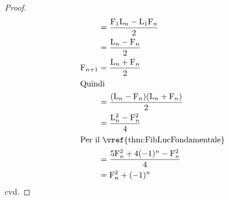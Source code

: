 \begin{proof}
\begin{align*}
		={}                   & \dfrac{\Fib{1}\Luc{n}-\Luc{1}\Fib{n}}{2}      \\
		={}                   & \dfrac{\Luc{n}-\Fib{n}}{2}                    \\
		\Fib{n+1}={}          & \dfrac{\Luc{n}+\Fib{n}}{2}                    \\
		\intertext{Quindi}
		={}                   & \dfrac{(\Luc{n}-\Fib{n})(\Luc{n}+\Fib{n})}{2} \\
		={}                   & \dfrac{\Luc{n}^2-\Fib{n}^2}{4}                \\
		\intertext{Per il~\vref{thm:FibLucFondamentale}}
		={}                   & \dfrac{5\Fib{n}^2+4(-1)^{n}-\Fib{n}^2}{4}     \\
		={}                   & \Fib{n}^2+(-1)^{n}
	\end{align*}
	cvd.
\end{proof}

